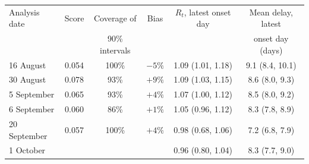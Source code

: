 \begin{tabular}{lccccc}
\toprule
Analysis date & Score & Coverage of & Bias & $R_t$, latest onset day & Mean delay, latest \\
 & & 90\% intervals & & & onset day (days) \\
\midrule
16 August & 0.054 & 100\% & $-5\%$ & 1.09 (1.01, 1.18) & 9.1 (8.4, 10.1) \\
30 August & 0.078 & 93\% & $+9\%$ & 1.09 (1.03, 1.15) & 8.6 (8.0, 9.3) \\
5 September & 0.065 & 93\% & $+4\%$ & 1.07 (1.00, 1.12) & 8.5 (8.0, 9.2) \\
6 September & 0.060 & 86\% & $+1\%$ & 1.05 (0.96, 1.12) & 8.3 (7.8, 8.9) \\
20 September & 0.057 & 100\% & $+4\%$ & 0.98 (0.68, 1.06) & 7.2 (6.8, 7.9) \\
1 October &  &  &  & 0.96 (0.80, 1.04) & 8.3 (7.7, 9.0) \\
\bottomrule
\end{tabular}
